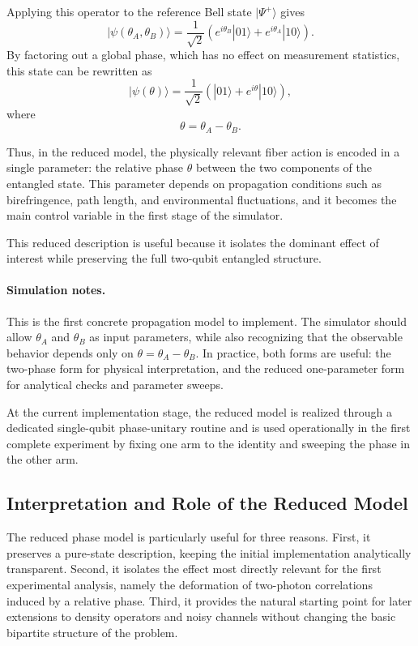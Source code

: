 \documentclass[a4paper]{article}
\begin{document}
Applying this operator to the reference Bell state \( |\Psi^+\rangle \) gives
\[
|\psi(\theta_A,\theta_B)\rangle
=
\frac{1}{\sqrt{2}}
\left(
e^{i\theta_B}|01\rangle
+
e^{i\theta_A}|10\rangle
\right).
\]
By factoring out a global phase, which has no effect on measurement statistics, this state can be rewritten as
\[
|\psi(\theta)\rangle
=
\frac{1}{\sqrt{2}}
\left(
|01\rangle
+
e^{i\theta}|10\rangle
\right),
\]
where
\[
\theta = \theta_A - \theta_B.
\]

Thus, in the reduced model, the physically relevant fiber action is encoded in a single parameter: the relative phase \(\theta\) between the two components of the entangled state. This parameter depends on propagation conditions such as birefringence, path length, and environmental fluctuations, and it becomes the main control variable in the first stage of the simulator.

This reduced description is useful because it isolates the dominant effect of interest while preserving the full two-qubit entangled structure.

\paragraph{Simulation notes.}
This is the first concrete propagation model to implement. The simulator should allow \(\theta_A\) and \(\theta_B\) as input parameters, while also recognizing that the observable behavior depends only on \(\theta=\theta_A-\theta_B\). In practice, both forms are useful: the two-phase form for physical interpretation, and the reduced one-parameter form for analytical checks and parameter sweeps.

At the current implementation stage, the reduced model is realized through a dedicated single-qubit phase-unitary routine and is used operationally in the first complete experiment by fixing one arm to the identity and sweeping the phase in the other arm.


\subsection{Interpretation and Role of the Reduced Model}

The reduced phase model is particularly useful for three reasons. First, it preserves a pure-state description, keeping the initial implementation analytically transparent. Second, it isolates the effect most directly relevant for the first experimental analysis, namely the deformation of two-photon correlations induced by a relative phase. Third, it provides the natural starting point for later extensions to density operators and noisy channels without changing the basic bipartite structure of the problem.
\end{document}
